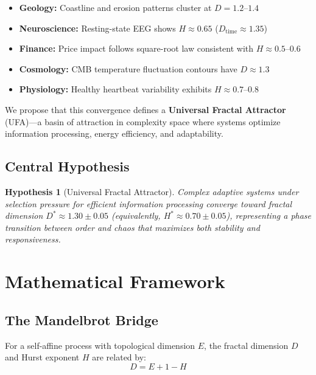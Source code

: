\documentclass[11pt,a4paper]{article}
\newtheorem{hypothesis}{Hypothesis}
\begin{document}
\begin{itemize}
    \item \textbf{Geology:} Coastline and erosion patterns cluster at $D = 1.2$--$1.4$
    \item \textbf{Neuroscience:} Resting-state EEG shows $H \approx 0.65$ ($D_{\text{time}} \approx 1.35$)
    \item \textbf{Finance:} Price impact follows square-root law consistent with $H \approx 0.5$--$0.6$
    \item \textbf{Cosmology:} CMB temperature fluctuation contours have $D \approx 1.3$
    \item \textbf{Physiology:} Healthy heartbeat variability exhibits $H \approx 0.7$--$0.8$
\end{itemize}

We propose that this convergence defines a \textbf{Universal Fractal Attractor} (UFA)---a basin of attraction in complexity space where systems optimize information processing, energy efficiency, and adaptability.

\subsection{Central Hypothesis}

\begin{hypothesis}[Universal Fractal Attractor]
Complex adaptive systems under selection pressure for efficient information processing converge toward fractal dimension $D^* \approx 1.30 \pm 0.05$ (equivalently, $H^* \approx 0.70 \pm 0.05$), representing a phase transition between order and chaos that maximizes both stability and responsiveness.
\end{hypothesis}

\section{Mathematical Framework}

\subsection{The Mandelbrot Bridge}

For a self-affine process with topological dimension $E$, the fractal dimension $D$ and Hurst exponent $H$ are related by:
\begin{equation}
\boxed{D = E + 1 - H}
\label{eq:mandelbrot}
\end{equation}
\end{document}
